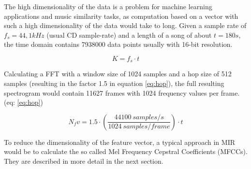 The high dimensionality of the data is a problem for machine learning applications and music similarity tasks, as computation based on a vector with such a high dimensionality of the data would take to long.
Given a sample rate of $f_s = 44,1kHz$ (usual CD sample-rate) and a length of a song of about $t = 180s$, the time domain contains 7938000 data points usually with 16-bit resolution. 

\begin{equation} \label{eq:points}
K = f_s \cdot t
\end{equation}

Calculating a FFT with a window size of 1024 samples and a hop size of 512 samples (resulting in the factor 1.5 in equation \ref{eq:hop})\cite{knees1}, the full resulting spectrogram would contain 11627 frames with 1024 frequency values per frame. (eq: \ref{eq:hop}) 

\begin{equation} \label{eq:hop}
N_fv = 1.5 \cdot (\frac{44100 \ samples/s}{1024 \ samples/frame}) \cdot t
\end{equation}

To reduce the dimensionality of the feature vector, a typical approach in MIR would be to calculate the so called Mel Frequency Cepstral Coefficients (MFCCs). They are described in more detail in the next section.

